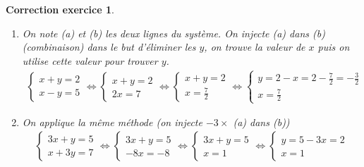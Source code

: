 \documentclass[12pt]{article}
\newtheorem{correction}{\bf Correction exercice}
\newenvironment{cor}{
\begin{correction}\smallskip\normalfont}{\end{correction}
}
\newif\ifcorrige\corrigetrue
\begin{document}
\ifcorrige
\color{magenta}
\begin{cor}
  $\qquad$
\begin{enumerate}
\item On note (a) et (b) les deux lignes du syst\`eme.
  On injecte (a) dans (b) (combinaison) dans le but d'\'eliminer les $y$,
  on trouve la valeur de $x$ puis
  on utilise cette valeur pour trouver $y$.
  \begin{align*}
    \left\{
      \begin{array}{l}
        x + y = 2
        \\
        x - y = 5
      \end{array}
    \right.
    \iff
    \left\{
      \begin{array}{l}
        x + y = 2
        \\
        2x = 7
      \end{array}
    \right.
    \iff
    \left\{
      \begin{array}{l}
        x + y = 2
        \\
        x = \frac72
      \end{array}
    \right.
    \iff
    \left\{
      \begin{array}{l}
        y = 2 - x = 2 - \frac72 = - \frac32
        \\
        x = \frac72
      \end{array}
    \right.
  \end{align*}
\item
  On applique la m\^eme m\'ethode (on injecte $-3 \times$ (a) dans (b))
  \begin{align*}
    \left\{
      \begin{array}{l}
        3x + y = 5
        \\
        x + 3y = 7
      \end{array}
    \right.
    \iff
    \left\{
      \begin{array}{l}
        3x + y = 5
        \\
        -8x  = -8
      \end{array}
    \right.
    \iff
    \left\{
      \begin{array}{l}
        3x + y = 5
        \\
        x  = 1
      \end{array}
    \right.
    \iff
    \left\{
      \begin{array}{l}
        y = 5 -3x = 2
        \\
        x  = 1
      \end{array}

\end{align*}
\end{enumerate}
\end{cor}
\end{document}
